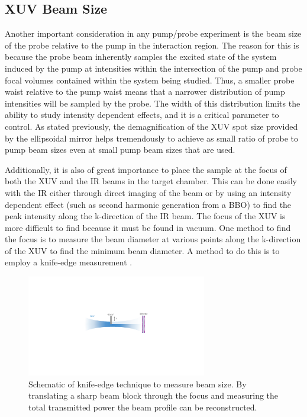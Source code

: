 \subsection{XUV Beam Size}
\label{sec:xuv_beam_size_knife_edge}

Another important consideration in any pump/probe experiment is the beam size of the probe relative to the pump in the interaction region.  The reason for this is because the probe beam inherently samples the excited state of the system induced by the pump at intensities within the intersection of the pump and probe focal volumes contained within the system being studied.  Thus, a smaller probe waist relative to the pump waist means that a narrower distribution of pump intensities will be sampled by the probe.  The width of this distribution limits the ability to study intensity dependent effects, and it is a critical parameter to control. As stated previously, the demagnification of the XUV spot size provided by the ellipsoidal mirror helps tremendously to achieve as small ratio of probe to pump beam sizes even at small pump beam sizes that are used.

Additionally, it is also of great importance to place the sample at the focus of both the XUV and the IR beams in the target chamber.  This can be done easily with the IR either through direct imaging of the beam or by using an intensity dependent effect (such as second harmonic generation from a BBO) to find the peak intensity along the k-direction of the IR beam.  The focus of the XUV is more difficult to find because it must be found in vacuum.  One method to find the focus is to measure the beam diameter at various points along the k-direction of the XUV to find the minimum beam diameter.  A method to do this is to employ a knife-edge measurement \cite{arnaudTechniqueFastMeasurement1971, skinnerMeasurementRadiusHighpower1972,marshallTwoMethodsMeasuring2010,almeidaHarmonicsBeamsCharacterization2016}.

\begin{figure}
	\centering
	\includegraphics[width=0.7\textwidth]{figures/Beamline/knife_edge_xuv.pdf}
	\caption[Schematic of knife-edge technique to measure beam size]{Schematic of knife-edge technique to measure beam size. By translating a sharp beam block through the focus and measuring the total transmitted power the beam profile can be reconstructed.}
	\label{fig:knife_edge_beam_size_measurement}
\end{figure}

